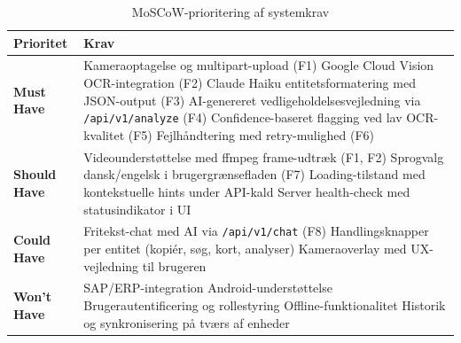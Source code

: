 \begin{table}[H]
  \centering
  \caption{MoSCoW-prioritering af systemkrav}
  \label{tab:moscow}
  \begin{tabularx}{\textwidth}{@{}lX@{}}
    \toprule
    \textbf{Prioritet} & \textbf{Krav} \\
    \midrule
    \textbf{Must Have}
    & Kameraoptagelse og multipart-upload (F1) \newline
      Google Cloud Vision OCR-integration (F2) \newline
      Claude Haiku entitetsformatering med JSON-output (F3) \newline
      AI-genereret vedligeholdelsesvejledning via \texttt{/api/v1/analyze} (F4) \newline
      Confidence-baseret flagging ved lav OCR-kvalitet (F5) \newline
      Fejlhåndtering med retry-mulighed (F6) \\
    \addlinespace
    \textbf{Should Have}
    & Videounderstøttelse med ffmpeg frame-udtræk (F1, F2) \newline
      Sprogvalg dansk/engelsk i brugergrænsefladen (F7) \newline
      Loading-tilstand med kontekstuelle hints under API-kald \newline
      Server health-check med statusindikator i UI \\
    \addlinespace
    \textbf{Could Have}
    & Fritekst-chat med AI via \texttt{/api/v1/chat} (F8) \newline
      Handlingsknapper per entitet (kopiér, søg, kort, analyser) \newline
      Kameraoverlay med UX-vejledning til brugeren \\
    \addlinespace
    \textbf{Won't Have}
    & SAP/ERP-integration \newline
      Android-understøttelse \newline
      Brugerautentificering og rollestyring \newline
      Offline-funktionalitet \newline
      Historik og synkronisering på tværs af enheder \\
    \bottomrule
  \end{tabularx}
\end{table}
